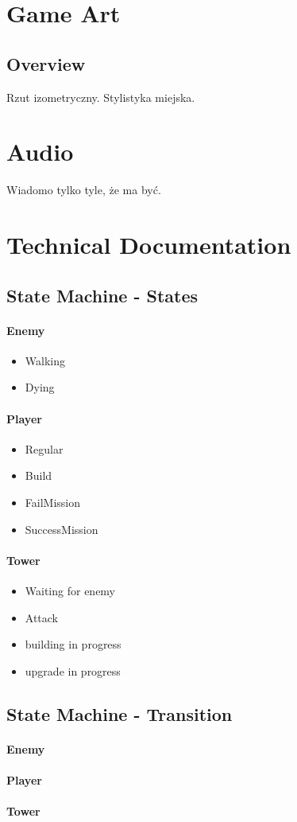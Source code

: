 \documentclass[12pt]{article}
\begin{document}
\newpage
\section{Game Art}
\subsection{Overview}
Rzut izometryczny. Stylistyka miejska.

\section{Audio}
Wiadomo tylko tyle, że ma być.

\newpage

\section{Technical Documentation}
\subsection{State Machine - States}
\paragraph{Enemy}
\begin{itemize}
	\item Walking
	\item Dying
\end{itemize}

\paragraph{Player}
\begin{itemize}
	\item Regular
	\item Build
	\item FailMission
	\item SuccessMission
\end{itemize}

\paragraph{Tower}
\begin{itemize}
	\item Waiting for enemy
	\item Attack
	\item building in progress
	\item upgrade in progress
\end{itemize}

\subsection{State Machine - Transition}
\paragraph{Enemy}
\paragraph{Player}
\paragraph{Tower}
\end{document}
